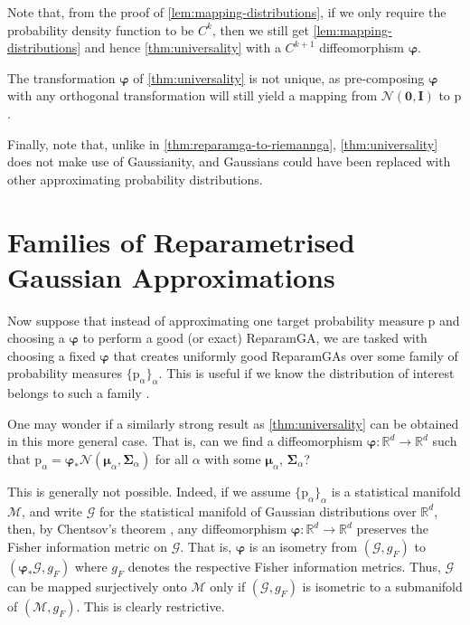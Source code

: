 \documentclass[runningheads,orivec]{llncs}
\newcommand{\R}{\mathbb R}
\begin{document}
Note that, from the proof of \cref{lem:mapping-distributions}, if we only require the probability density function to be $C^k$, then we still get \cref{lem:mapping-distributions} and hence \cref{thm:universality} with a $C^{k+1}$ diffeomorphism $\bm\varphi$.

The transformation $\bm\varphi$ of \cref{thm:universality} is not unique, as pre-composing $\bm\varphi$ with any orthogonal transformation will still yield a mapping from $\mathcal N(\bm 0,\bm I)$ to $\mathrm p$.

Finally, note that, unlike in \cref{thm:reparamga-to-riemannga}, \cref{thm:universality} does not make use of Gaussianity, and Gaussians could have been replaced with other approximating probability distributions.

\section{Families of Reparametrised Gaussian Approximations}\label{sec:families}
Now suppose that instead of approximating one target probability measure $\mathrm p$ and choosing a $\bm\varphi$ to perform a good (or exact) ReparamGA, we are tasked with choosing a fixed $\bm\varphi$ that creates uniformly good ReparamGAs over some family of probability measures $\{\mathrm p_\alpha\}_{\alpha}$. This is useful if we know the distribution of interest belongs to such a family \cite{mackay_choice_1998,mucsanyi_rethinking_2025}.

One may wonder if a similarly strong result as \cref{thm:universality} can be obtained in this more general case. That is, can we find a diffeomorphism $\bm\varphi\colon\R^d\to\R^d$ such that $\mathrm p_{\alpha} = \bm\varphi_*\mathcal N(\bm \mu_{\alpha}, \bm \Sigma_{\alpha})$ for all $\alpha$ with some $\bm\mu_{\alpha}$, $\bm\Sigma_{\alpha}$?

This is generally not possible. Indeed, if we assume $\{\mathrm p_\alpha\}_{\alpha}$ is a statistical manifold $\mathcal M$, and write $\mathcal G$ for the statistical manifold of Gaussian distributions over $\R^d$, then, by Chentsov's theorem \cite[Section 5.1.4]{ay_information_2017}, any diffeomorphism $\bm\varphi\colon \R^d\to \R^d$ preserves the Fisher information metric on $\mathcal G$. That is, $\bm\varphi$ is an isometry from $(\mathcal G,g_F)$ to $(\bm\varphi_*\mathcal G, g_F)$ where $g_F$ denotes the respective Fisher information metrics. Thus, $\mathcal G$ can be mapped surjectively onto $\mathcal M$ only if $(\mathcal G,g_F)$ is isometric to a submanifold of $(\mathcal M,g_F)$. This is clearly restrictive.
\end{document}
